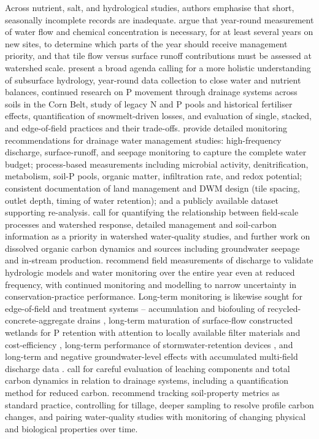 \documentclass[11pt]{article}
\begin{document}
Across nutrient, salt, and hydrological studies, authors emphasise that short,
seasonally incomplete records are inadequate. \textcite{Kladivko2001} argue that
year-round measurement of water flow and chemical concentration is necessary, for
at least several years on new sites, to determine which parts of the year should
receive management priority, and that tile flow versus surface runoff contributions
must be assessed at watershed scale. \textcite{Sharpley2019} present a broad agenda
calling for a more holistic understanding of subsurface hydrology, year-round data
collection to close water and nutrient balances, continued research on P movement
through drainage systems across soils in the Corn Belt, study of legacy N and P
pools and historical fertiliser effects, quantification of snowmelt-driven losses,
and evaluation of single, stacked, and edge-of-field practices and their
trade-offs. \textcite{Frankenberger2024} provide detailed monitoring
recommendations for drainage water management studies: high-frequency discharge,
surface-runoff, and seepage monitoring to capture the complete water budget;
process-based measurements including microbial activity, denitrification,
metabolism, soil-P pools, organic matter, infiltration rate, and redox potential;
consistent documentation of land management and DWM design (tile spacing, outlet
depth, timing of water retention); and a publicly available dataset supporting
re-analysis. \textcite{Williams2017} call for quantifying the relationship between
field-scale processes and watershed response, detailed management and soil-carbon
information as a priority in watershed water-quality studies, and further work on
dissolved organic carbon dynamics and sources including groundwater seepage and
in-stream production. \textcite{Drake2018} recommend field measurements of
discharge to validate hydrologic models and water monitoring over the entire year
even at reduced frequency, with continued monitoring and modelling to narrow
uncertainty in conservation-practice performance. Long-term monitoring is likewise
sought for edge-of-field and treatment systems -- accumulation and biofouling of
recycled-concrete-aggregate drains \parencite{McCulloch2017}, long-term maturation
of surface-flow constructed wetlands for P retention with attention to locally
available filter materials and cost-efficiency \parencite{Mendes2020}, long-term
performance of stormwater-retention devices \parencite{Xu2022}, and long-term and
negative groundwater-level effects with accumulated multi-field discharge data
\parencite{Okuda2020}. \textcite{Furukawa2008} call for careful evaluation of
leaching components and total carbon dynamics in relation to drainage systems,
including a quantification method for reduced carbon. \textcite{Frankl2023}
recommend tracking soil-property metrics as standard practice, controlling for
tillage, deeper sampling to resolve profile carbon changes, and pairing
water-quality studies with monitoring of changing physical and biological
properties over time.
\end{document}
